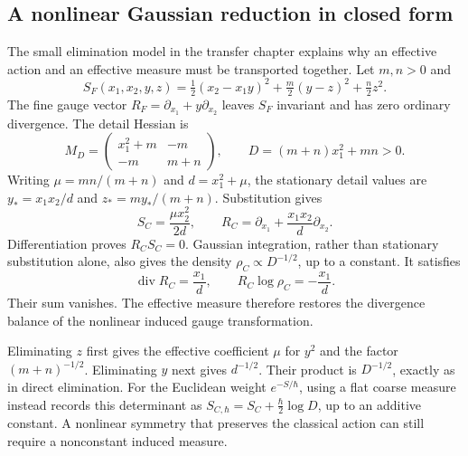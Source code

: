 \subsection{A nonlinear Gaussian reduction in closed form}
The small elimination model in the transfer chapter explains why an effective action and an effective measure must be transported together. Let $m,n>0$ and
\begin{equation}
 S_F(x_1,x_2,y,z)=\tfrac12(x_2-x_1y)^2
                         +\tfrac m2(y-z)^2+\tfrac n2z^2.
\end{equation}
The fine gauge vector $R_F=\partial_{x_1}+y\partial_{x_2}$ leaves $S_F$ invariant and has zero ordinary divergence. The detail Hessian is
\begin{equation}
 M_D=\begin{pmatrix}x_1^2+m&-m\\-m&m+n\end{pmatrix},
 \qquad D=(m+n)x_1^2+mn>0.
\end{equation}
Writing $\mu=mn/(m+n)$ and $d=x_1^2+\mu$, the stationary detail values are
$y_*=x_1x_2/d$ and $z_*=my_* /(m+n)$. Substitution gives
\begin{equation}
 S_C=\frac{\mu x_2^2}{2d},\qquad
 R_C=\partial_{x_1}+\frac{x_1x_2}{d}\partial_{x_2}.
\end{equation}
Differentiation proves $R_CS_C=0$. Gaussian integration, rather than stationary substitution alone, also gives the density $\rho_C\propto D^{-1/2}$, up to a constant. It satisfies
\begin{equation}
 \operatorname{div}R_C=\frac{x_1}{d},\qquad
 R_C\log\rho_C=-\frac{x_1}{d}.
\end{equation}
Their sum vanishes. The effective measure therefore restores the divergence balance of the nonlinear induced gauge transformation.

Eliminating $z$ first gives the effective coefficient $\mu$ for $y^2$ and the factor $(m+n)^{-1/2}$. Eliminating $y$ next gives $d^{-1/2}$. Their product is $D^{-1/2}$, exactly as in direct elimination. For the Euclidean weight $e^{-S/\hbar}$, using a flat coarse measure instead records this determinant as
$S_{C,\hbar}=S_C+\tfrac\hbar2\log D$, up to an additive constant. A nonlinear symmetry that preserves the classical action can still require a nonconstant induced measure.

